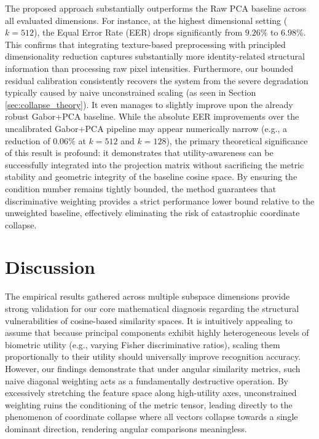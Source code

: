 \documentclass[conference]{IEEEtran}
\begin{document}
The proposed approach substantially outperforms the Raw PCA baseline across all evaluated dimensions. For instance, at the highest dimensional setting ($k=512$), the Equal Error Rate (EER) drops significantly from $9.26\%$ to $6.98\%$. This confirms that integrating texture-based preprocessing with principled dimensionality reduction captures substantially more identity-related structural information than processing raw pixel intensities. Furthermore, our bounded residual calibration consistently recovers the system from the severe degradation typically caused by naive unconstrained scaling (as seen in Section \ref{sec:collapse_theory}). It even manages to slightly improve upon the already robust Gabor+PCA baseline. While the absolute EER improvements over the uncalibrated Gabor+PCA pipeline may appear numerically narrow (e.g., a reduction of $0.06\%$ at $k=512$ and $k=128$), the primary theoretical significance of this result is profound: it demonstrates that utility-awareness can be successfully integrated into the projection matrix without sacrificing the metric stability and geometric integrity of the baseline cosine space. By ensuring the condition number remains tightly bounded, the method guarantees that discriminative weighting provides a strict performance lower bound relative to the unweighted baseline, effectively eliminating the risk of catastrophic coordinate collapse.

\section{Discussion}
\label{sec:discussion}

The empirical results gathered across multiple subspace dimensions provide strong validation for our core mathematical diagnosis regarding the structural vulnerabilities of cosine-based similarity spaces. It is intuitively appealing to assume that because principal components exhibit highly heterogeneous levels of biometric utility (e.g., varying Fisher discriminative ratios), scaling them proportionally to their utility should universally improve recognition accuracy. However, our findings demonstrate that under angular similarity metrics, such naive diagonal weighting acts as a fundamentally destructive operation. By excessively stretching the feature space along high-utility axes, unconstrained weighting ruins the conditioning of the metric tensor, leading directly to the phenomenon of coordinate collapse where all vectors collapse towards a single dominant direction, rendering angular comparisons meaningless.
\end{document}
